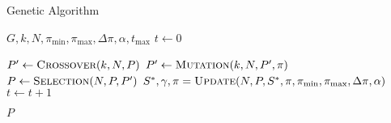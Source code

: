 \begin{algorithm}[t]
  \caption{Genetic Algorithm}\label{alg:GENETIKUS_ALGORITMUS}
  \begin{algorithmic}[1]
    \Require $G, k, N, \pi_{\min}, \pi_{\max}, \Delta \pi, \alpha, t_{\max}$
    \State $t \leftarrow 0$
    \State {}

    \State $P' \leftarrow \Call{Crossover}{k, N, P}$
    \State $P' \leftarrow \Call{Mutation}{k, N, P', \pi}$
    \State $P \leftarrow \Call{Selection}{N, P, P'}$
    \State $S^{*}, \gamma, \pi = \Call{Update}{N, P, S^{*}, \pi, \pi_{\min}, \pi_{\max}, \Delta \pi, \alpha}$
    \State $t \leftarrow t + 1$
    \EndWhile

    \State \Return $P$
  \end{algorithmic}
\end{algorithm}
